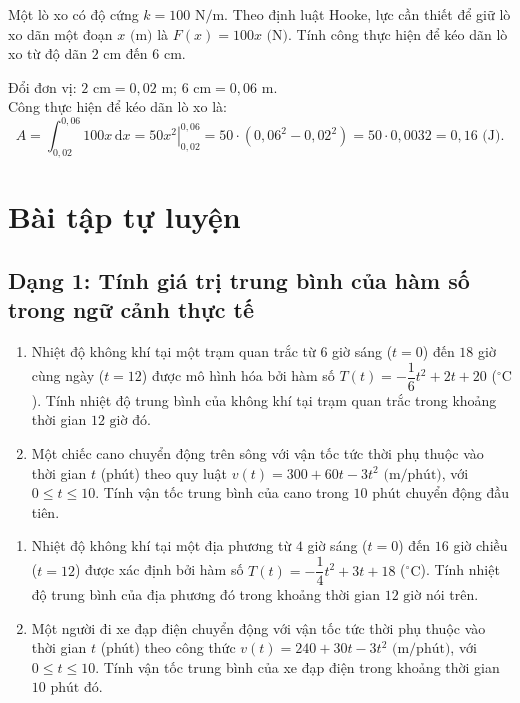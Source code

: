 \documentclass[12pt]{article}
\begin{document}
	\begin{vidu}[5]
		Một lò xo có độ cứng $k = 100\text{ N/m}$. Theo định luật Hooke, lực cần thiết để giữ lò xo dãn một đoạn $x\text{ (m)}$ là $F(x) = 100x\text{ (N)}$. Tính công thực hiện để kéo dãn lò xo từ độ dãn $2\text{ cm}$ đến $6\text{ cm}$.
	\end{vidu}
	\begin{loigiai}
		Đổi đơn vị: $2\text{ cm} = 0{,}02\text{ m}$; $6\text{ cm} = 0{,}06\text{ m}$.\\
		Công thực hiện để kéo dãn lò xo là:
		\[
		A = \int_{0{,}02}^{0{,}06} 100x\,\mathrm{d}x = \left. 50x^2 \right|_{0{,}02}^{0{,}06} = 50 \cdot (0{,}06^2 - 0{,}02^2) = 50 \cdot 0{,}0032 = 0{,}16\text{ (J)}.
		\]
	\end{loigiai}
	
	\newpage
	
	\section{Bài tập tự luyện}\label{sec:baitap}
	
	\subsection{Dạng 1: Tính giá trị trung bình của hàm số trong ngữ cảnh thực tế}
	\begin{btxanh}
		\begin{enumerate}[label=\textbf{Bài \arabic*.}]
			\item Nhiệt độ không khí tại một trạm quan trắc từ $6$ giờ sáng ($t = 0$) đến $18$ giờ cùng ngày ($t = 12$) được mô hình hóa bởi hàm số $T(t) = -\dfrac{1}{6}t^2 + 2t + 20$ ($^\circ\text{C}$). Tính nhiệt độ trung bình của không khí tại trạm quan trắc trong khoảng thời gian $12\text{ giờ}$ đó.
			\item Một chiếc cano chuyển động trên sông với vận tốc tức thời phụ thuộc vào thời gian $t$ (phút) theo quy luật $v(t) = 300 + 60t - 3t^2\text{ (m/phút)}$, với $0 \le t \le 10$. Tính vận tốc trung bình của cano trong $10\text{ phút}$ chuyển động đầu tiên.
		\end{enumerate}
	\end{btxanh}
	
	\begin{btvang}
		\begin{enumerate}[label=\textbf{Bài \arabic*.}]
			\item Nhiệt độ không khí tại một địa phương từ $4$ giờ sáng ($t = 0$) đến $16$ giờ chiều ($t = 12$) được xác định bởi hàm số $T(t) = -\dfrac{1}{4}t^2 + 3t + 18$ ($^\circ\text{C}$). Tính nhiệt độ trung bình của địa phương đó trong khoảng thời gian $12\text{ giờ}$ nói trên.
			\item Một người đi xe đạp điện chuyển động với vận tốc tức thời phụ thuộc vào thời gian $t$ (phút) theo công thức $v(t) = 240 + 30t - 3t^2\text{ (m/phút)}$, với $0 \le t \le 10$. Tính vận tốc trung bình của xe đạp điện trong khoảng thời gian $10\text{ phút}$ đó.
		\end{enumerate}
	\end{btvang}
	
\end{document}
